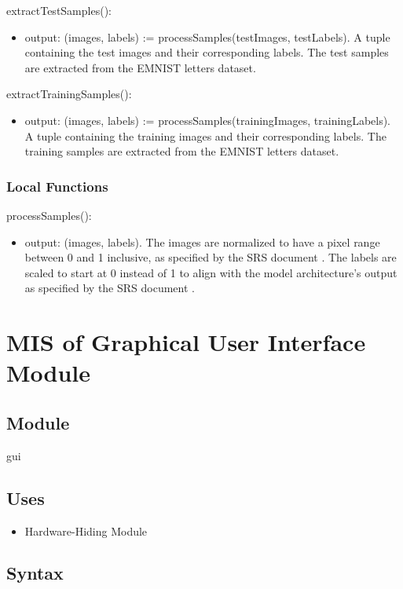 \documentclass[12pt, titlepage]{article}
\begin{document}
\noindent extractTestSamples():
\begin{itemize}
\item output: (images, labels) := processSamples(testImages, testLabels). A
tuple containing the test images and their corresponding labels. The test
samples are extracted from the EMNIST letters dataset.
\end{itemize}

\noindent extractTrainingSamples():
\begin{itemize}
\item output: (images, labels) := processSamples(trainingImages, trainingLabels).
A tuple containing the training images and their corresponding labels. The
training samples are extracted from the EMNIST letters dataset.
\end{itemize}

\subsubsection{Local Functions}

\noindent processSamples():
\begin{itemize}
\item output: (images, labels). The images are normalized to have a pixel range
between 0 and 1 inclusive, as specified by the SRS document \citep{SRS}. The
labels are scaled to start at 0 instead of 1 to align with the model
architecture's output as specified by the SRS document \citep{SRS}.
\end{itemize}


\newpage
\section{MIS of Graphical User Interface Module} \label{MGUI}

\subsection{Module}

gui
\subsection{Uses}

\begin{itemize}
  \item Hardware-Hiding Module
\end{itemize}

\subsection{Syntax}
\end{document}
